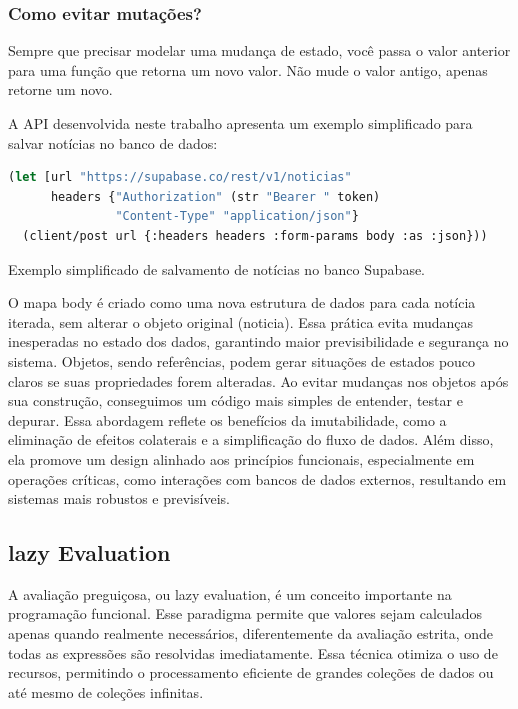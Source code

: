 \subsubsection*{Como evitar mutações?}
Sempre que precisar modelar uma mudança de estado, você passa o valor anterior para uma função que retorna um novo valor. Não mude o valor antigo, apenas retorne um novo.

A API desenvolvida neste trabalho apresenta um exemplo simplificado para salvar notícias no banco de dados:

\begin{tcolorbox}[colback=gray!5!white, colframe=gray!75!black, title={Quadro 8 - Integração com Supabase}]
\begin{lstlisting}[language=Lisp]
(let [url "https://supabase.co/rest/v1/noticias"
      headers {"Authorization" (str "Bearer " token)
               "Content-Type" "application/json"}
  (client/post url {:headers headers :form-params body :as :json}))
\end{lstlisting}
\caption{Exemplo simplificado de salvamento de notícias no banco Supabase.}
\end{tcolorbox}

O mapa body é criado como uma nova estrutura de dados para cada notícia iterada, sem alterar o objeto original (noticia). Essa prática evita mudanças inesperadas no estado dos dados, garantindo maior previsibilidade e segurança no sistema. Objetos, sendo referências, podem gerar situações de estados pouco claros se suas propriedades forem alteradas. Ao evitar mudanças nos objetos após sua construção, conseguimos um código mais simples de entender, testar e depurar. Essa abordagem reflete os benefícios da imutabilidade, como a eliminação de efeitos colaterais e a simplificação do fluxo de dados. Além disso, ela promove um design alinhado aos princípios funcionais, especialmente em operações críticas, como interações com bancos de dados externos, resultando em sistemas mais robustos e previsíveis.

\subsection{lazy Evaluation}

A avaliação preguiçosa, ou lazy evaluation, é um conceito importante na programação funcional. Esse paradigma permite que valores sejam calculados apenas quando realmente necessários, diferentemente da avaliação estrita, onde todas as expressões são resolvidas imediatamente. Essa técnica otimiza o uso de recursos, permitindo o processamento eficiente de grandes coleções de dados ou até mesmo de coleções infinitas.

